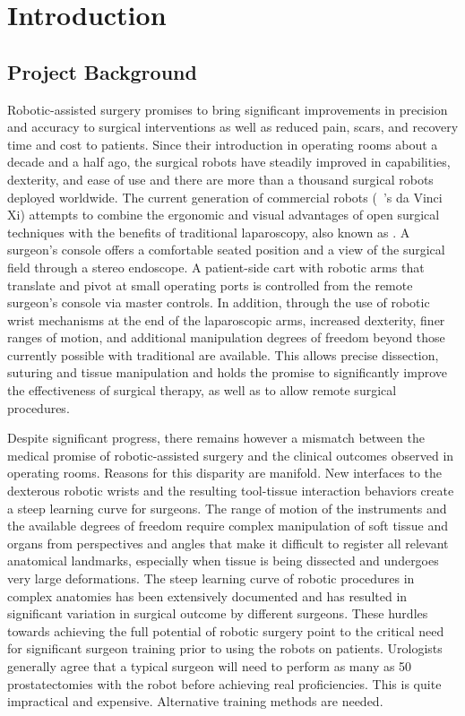 
\chapter{Introduction}\label{chp:introduction}

\section{Project Background}\label{sec:background}
Robotic-assisted surgery promises to bring significant improvements in precision and accuracy to surgical interventions as well as reduced pain, scars, and recovery time and cost to patients. Since their introduction in operating rooms about a decade and a half ago, the surgical robots have steadily improved in capabilities, dexterity, and ease of use and there are more than a thousand surgical robots deployed worldwide. The current generation of commercial robots (\eg\ 's da Vinci Xi) attempts to combine the ergonomic and visual advantages of open surgical techniques with the benefits of traditional laparoscopy, also known as . A surgeon's console offers a comfortable seated position and a  view of the surgical field through a stereo endoscope. A patient-side cart with robotic arms that translate and pivot at small operating ports is controlled from the remote surgeon's console via master controls. In addition, through the use of robotic wrist mechanisms at the end of the laparoscopic arms, increased dexterity, finer ranges of motion, and additional manipulation degrees of freedom beyond those currently possible with traditional  are available. This allows precise dissection, suturing and tissue manipulation and holds the promise to significantly improve the effectiveness of surgical therapy, as well as to allow remote surgical procedures.

Despite significant progress, there remains however a mismatch between the medical promise of robotic-assisted surgery and the clinical outcomes observed in operating rooms. Reasons for this disparity are manifold. New interfaces to the dexterous robotic wrists and the resulting tool-tissue interaction behaviors create a steep learning curve for surgeons. The range of motion of the instruments and the available degrees of freedom require complex manipulation of soft tissue and organs from perspectives and angles that make it difficult to register all relevant anatomical landmarks, especially when tissue is being dissected and undergoes very large deformations. The steep learning curve of robotic  procedures in complex anatomies has been extensively documented and has resulted in significant variation in surgical outcome by different surgeons. These hurdles towards achieving the full potential of robotic surgery point to the critical need for significant surgeon training prior to using the robots on patients. Urologists generally agree that a typical surgeon will need to perform as many as 50 prostatectomies with the robot before achieving real proficiencies. This is quite impractical and expensive. Alternative training methods are needed.

